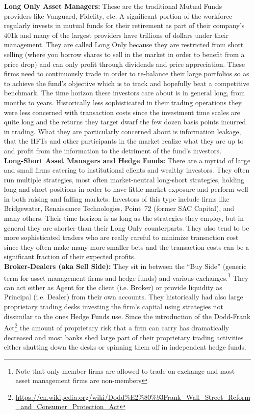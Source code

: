 \noindent\textbf{Long Only Asset Managers:} These are the traditional Mutual Funds providers like Vanguard, Fidelity, etc. A significant portion of the workforce regularly invests in mutual funds for their retirement as part of their company's 401k and many of the largest providers have trillions of dollars under their management. They are called Long Only because they are restricted from short selling (where you borrow shares to sell in the market in order to benefit from a price drop) and can only profit through dividends and price appreciation. These firms need to continuously trade in order to re-balance their large portfolios so as to achieve the fund's objective which is to track and hopefully beat a competitive benchmark. The time horizon these investors care about is in general long, from months to years. Historically less sophisticated in their trading operations they were less concerned with transaction costs since the investment time scales are quite long and the returns they target dwarf the few dozen basis points incurred in trading. What they are particularly concerned about is information leakage, that the HFTs and other participants in the market realize what they are up to and profit from the information to the detriment of the fund's investors. \\


\noindent\textbf{Long-Short Asset Managers and Hedge Funds:} There are a myriad of large and small firms catering to institutional clients and wealthy investors. They often run multiple strategies, most often market-neutral long-short strategies, holding long and short positions in order to have little market exposure and  perform well in both raising and falling markets. Investors of this type include firms like Bridgewater, Renaissance Technologies, Point~72 (former SAC Capital), and many others. Their time horizon is as long as the strategies they employ, but in general they are shorter than their Long Only counterparts. They also tend to be more sophisticated traders who are really careful to minimize transaction cost since they often make many more smaller bets and the transaction costs can be a significant fraction of their expected profits. \\


\noindent\textbf{Broker-Dealers (aka Sell Side):} They sit in between the ``Buy Side'' (generic term for asset management firms and hedge funds) and various exchanges.\footnote{Note that only member firms are allowed to trade on exchange and most asset management firms are non-members} They can act either as Agent for the client (i.e. Broker) or provide liquidity as Principal (i.e. Dealer) from their own accounts. They historically had  also large proprietary trading desks investing the firm's capital using strategies not dissimilar to the ones Hedge Funds use. Since the introduction of the Dodd-Frank Act\footnote{\url{https://en.wikipedia.org/wiki/Dodd\%E2\%80\%93Frank_Wall_Street_Reform_and_Consumer_Protection_Act}} the amount of proprietary risk that a firm can carry has dramatically decreased and most banks shed large part of their proprietary trading activities either shutting down the desks or spinning them off in independent hedge funds. \\


